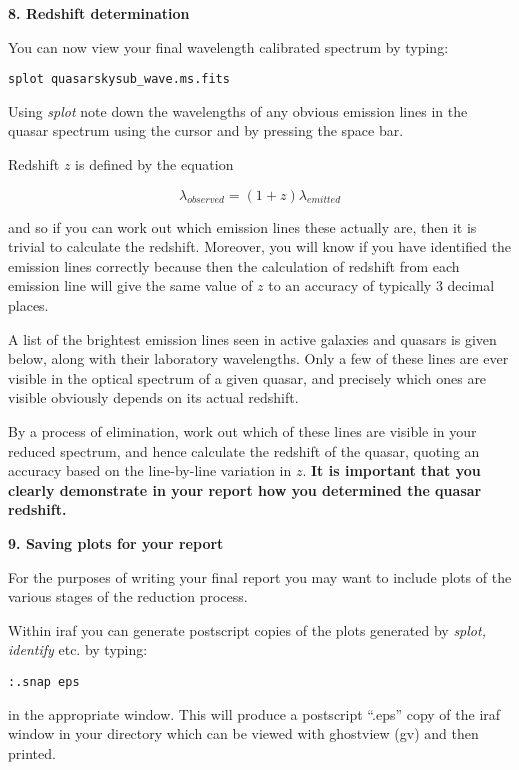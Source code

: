 {\large {\bf 8. Redshift determination}}

You can now view your final wavelength calibrated spectrum by typing:

{\tt splot \verb,quasarskysub_wave.ms.fits,}

Using {\it splot} note down the wavelengths of any obvious emission lines in the quasar spectrum using the cursor and by pressing the space bar.

\bigskip

Redshift $z$ is defined by the equation

$$\lambda_{observed} = (1 + z) \lambda_{emitted}$$

and so if you can work out which emission lines these actually are, then it is trivial to calculate the redshift. Moreover, you will know if you have identified the emission lines correctly because then the calculation of redshift from each emission line will give the same value of $z$ to an accuracy of typically 3 decimal places.

A list of the brightest emission lines seen in active galaxies and quasars is given below, along with their laboratory wavelengths. Only a few of these lines are ever visible in the optical spectrum of a given quasar, and precisely which ones are visible obviously depends on its actual redshift.
 
By a process of elimination, work out which of these lines are visible in your reduced spectrum, and hence calculate the redshift of the quasar, quoting an accuracy based on the line-by-line variation in $z$. {\bf It is important that you clearly demonstrate in your report how you determined the quasar redshift.}

{\large {\bf 9. Saving plots for your report}}

For the purposes of writing your final report you may want to include plots of the various stages of the reduction process.

Within {\sc iraf} you can generate postscript copies of the plots generated by {\it splot, identify} etc. by typing:

{\tt :.snap eps}

in the appropriate window. This will produce a postscript ``.eps'' copy of the {\sc iraf} window in your directory which can be viewed with ghostview (gv) and then printed.

